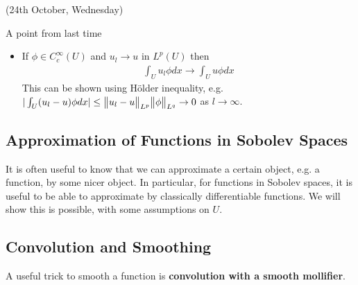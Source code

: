 \documentclass[12pt,a4paper]{report}
\begin{document}
\newday

(24th October, Wednesday)
\s

A point from last time 
\begin{itemize}
\item If $\phi \in C_c^{\infty} (U)$ and $u_l \rightarrow u$ in $L^p(U)$ then
\begin{align*}
\int_U u_l \phi dx \rightarrow \int_U u\phi dx
\end{align*}
This can be shown using H\"{o}lder inequality, e.g. $|\int_U (u_l -u)\phi dx| \leq \bigl\lVert u_l - u\bigr\rVert_{L^p} \bigl\lVert\phi\bigr\rVert_{L^q} \rightarrow 0$ as $l\rightarrow \infty$.
\end{itemize}
\s

\subsection*{Approximation of Functions in Sobolev Spaces}

It is often useful to know that we can approximate a certain object, e.g. a function, by some nicer object. In particular, for functions in Sobolev spaces, it is useful to be able to approximate by classically differentiable functions. We will show this is possible, with some assumptions on $U$.

\subsection*{Convolution and Smoothing}

A useful trick to smooth a function is \textbf{convolution with a smooth mollifier}.
\s
\end{document}
